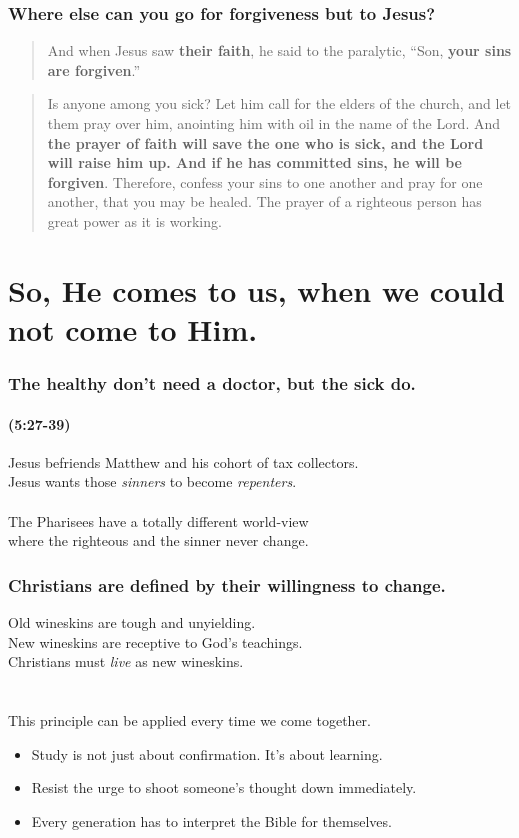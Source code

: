 \documentclass{beamer}
\begin{document}
\begin{frame}
\frametitle{Where else can you go for forgiveness but to Jesus?}
\begin{quote} 
And when Jesus saw \textbf{their faith}, he said to the paralytic, ``Son, \textbf{your sins are forgiven}.''

\end{quote}

\begin{quote}
Is anyone among you sick? Let him call for the elders of the church, and let them pray over him, anointing him with oil in the name of the Lord. And \textbf{the prayer of faith will save the one who is sick, and the Lord will raise him up. And if he has committed sins, he will be forgiven}. Therefore, confess your sins to one another and pray for one another, that you may be healed. The prayer of a righteous person has great power as it is working.

\end{quote}

\end{frame}

\section{So, He comes to us, when we could not come to Him.}

\begin{frame}
\frametitle{The healthy don't need a doctor, but the sick do.}
\framesubtitle{(5:27-39)}
Jesus befriends Matthew and his cohort of tax collectors.\\
Jesus wants those \emph{sinners} to become \emph{repenters}.\\~\\
The Pharisees have a totally different world-view\\where the righteous and the sinner never change.
\end{frame}

\begin{frame}
\frametitle{Christians are defined by their willingness to change.}
Old wineskins are tough and unyielding.\\
New wineskins are receptive to God's teachings.\\
Christians must \emph{live} as new wineskins.\\~\\~\\
This principle can be applied every time we come together.
\begin{itemize}
\item Study is not just about confirmation. It's about learning.
\item Resist the urge to shoot someone's thought down immediately.
\item Every generation has to interpret the Bible for themselves.
\end{itemize}

\end{frame}
\end{document}
